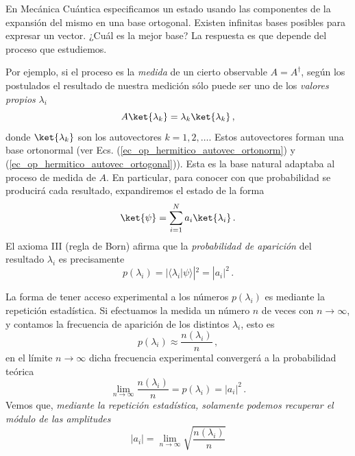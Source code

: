 \documentclass[a4paper,11pt]{book} %
\numberwithin{equation}{chapter}
\newcommand{\braket}[2]{\langle #1|#2\rangle}
\begin{document}
En Mecánica Cuántica especificamos un estado usando las componentes de la expansión del mismo en una base ortogonal. Existen infinitas bases posibles para expresar un vector. ¿Cuál es la mejor base? La respuesta es que depende del proceso que estudiemos. 

Por ejemplo, si el proceso es la \textit{medida} de un cierto observable $A = A^\dagger$, según los postulados el resultado de nuestra medición sólo puede ser uno de los \textit{valores propios} $\lambda_i$
	\begin{equation}
	A \ket{\lambda_k} = \lambda_k \ket{\lambda_k} \,,
	\end{equation}
donde $\ket{\lambda_k}$ son los autovectores $k = 1,2,\dots$. Estos autovectores forman una base ortonormal (ver Ecs. (\ref{ec_op_hermitico_autovec_ortonorm}) y (\ref{ec_op_hermitico_autovec_ortogonal})). Esta es la base natural adaptaba al proceso de medida de $A$. En particular, para conocer con que probabilidad se producirá cada resultado, expandiremos el estado de la forma
	\begin{equation}
	\ket{\psi} = \sum_{i=1}^{N} a_i \ket{\lambda_i} \, .
	\end{equation}
El axioma III (regla de Born) afirma que la \textit{probabilidad de aparición} del resultado $\lambda_i$ es precisamente
	\begin{equation}
	p(\lambda_i) = | \braket{\lambda_i}{\psi} |^2 = |a_i|^2 \, .
	\end{equation}

La forma de tener acceso experimental a los números $p(\lambda_i)$ es mediante la repetición estadística. Si efectuamos la medida un número $n$ de veces con $n \rightarrow \infty$, y contamos la frecuencia de aparición de los distintos $\lambda_i$, esto es 
	\begin{equation}
	p(\lambda_i) \approx \frac{n(\lambda_i)}{n} \, ,
	\end{equation}
en el límite $n \rightarrow \infty$ dicha frecuencia experimental convergerá a la probabilidad teórica
	\begin{equation}
	\lim_{n \rightarrow \infty} \frac{n(\lambda_i)}{n} = p(\lambda_i) = | a_i |^2 \, .
	\end{equation}
Vemos que, \textit{mediante la repetición estadística, solamente podemos recuperar el módulo de las amplitudes}
	\begin{equation}
	|a_i| = \lim_{n \rightarrow \infty} \sqrt{\frac{n(\lambda_i)}{n}}
	\end{equation}
\end{document}
